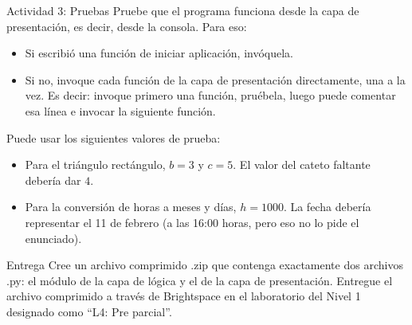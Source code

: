 \documentclass{ip-lab}
\begin{document}
\pagebreak

\begin{sectionbox}{Actividad 3: Pruebas}
Pruebe que el programa funciona desde la capa de presentación, es decir, desde la consola. Para eso:
\begin{itemize}
    \item Si escribió una función de iniciar aplicación, invóquela.
    \item Si no, invoque cada función de la capa de presentación directamente, una a la vez. Es decir: invoque primero una función, pruébela, luego puede comentar esa línea e invocar la siguiente función.
\end{itemize}

Puede usar los siguientes valores de prueba:
\begin{itemize}
  \item Para el triángulo rectángulo, $b = 3$ y $c = 5$. El valor del cateto faltante debería dar $4$.
  \item Para la conversión de horas a meses y días, $h = 1000$. La fecha debería representar el 11 de febrero (a las 16:00 horas, pero eso no lo pide el enunciado).
\end{itemize}

\end{sectionbox}

\begin{sectionbox}{Entrega}
  Cree un archivo comprimido .zip que contenga exactamente dos archivos .py: el módulo de la capa de lógica y el de la capa de presentación. Entregue el archivo comprimido a través de Brightspace en el laboratorio del Nivel 1 designado como ``L4: Pre parcial''.
\end{sectionbox}
\end{document}
